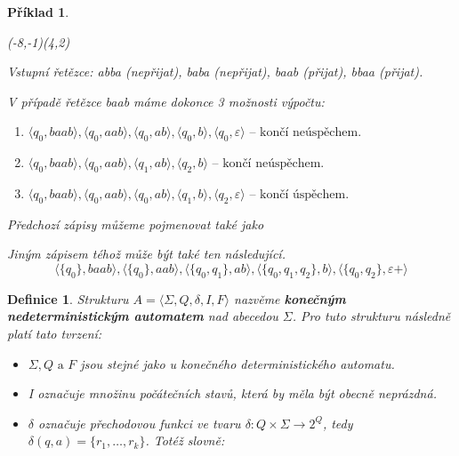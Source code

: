 \documentclass[10pt, a4paper, titlepage]{article}
\theoremstyle{note}
\newtheorem{definice}{\textbf{Definice}}
\newtheorem{priklad}{\textbf{Příklad}}
\begin{document}
\begin{priklad}
\vspace{20px}
\begin{VCPicture}{(-8,-1)(4,2)}

\end{VCPicture}


Vstupní řetězce: \textit{abba} (nepřijat), \textit{baba} (nepřijat), \textit{baab} (přijat), \textit{bbaa} (přijat).

V případě řetězce \textit{baab} máme dokonce 3 možnosti výpočtu:
\begin{enumerate}
\item
$\langle q_{0}, baab \rangle, \langle q_{0}, aab \rangle, \langle q_{0}, ab \rangle, \langle q_{0}, b \rangle, \langle q_{0}, \varepsilon \rangle \text{ -- končí neúspěchem.}$
\item
$\langle q_{0}, baab \rangle, \langle q_{0}, aab \rangle, \langle q_{1}, ab \rangle, \langle q_{2}, b \rangle \text{ -- končí neúspěchem.}$
\item
$\langle q_{0}, baab \rangle, \langle q_{0}, aab \rangle, \langle q_{0}, ab \rangle, \langle q_{1}, b \rangle, \langle q_{2}, \varepsilon \rangle \text{ -- končí úspěchem.}$ 
\end{enumerate}
Předchozí zápisy můžeme pojmenovat také jako 

Jiným zápisem téhož může být také ten následující.
$$
\langle \lbrace q_{0} \rbrace, baab \rangle, \langle \lbrace q_{0} \rbrace, aab \rangle, \langle \lbrace q_{0}, q_{1} \rbrace, ab \rangle,
\langle \lbrace q_{0}, q_{1}, q_{2} \rbrace, b \rangle, \langle \lbrace q_{0}, q_{2} \rbrace, \varepsilon+ \rangle
$$ 
\end{priklad}

\begin{definice}
Strukturu $A = \langle \Sigma, Q, \delta, I, F \rangle$ nazvěme \textbf{konečným nedeterministickým automatem} nad abecedou $\Sigma$. Pro tuto strukturu následně platí tato tvrzení:
\begin{itemize}
\item
$\Sigma, Q \text{ a } F$ jsou stejné jako u konečného deterministického automatu.
\item
\textit{I} označuje množinu počátečních stavů, která by měla být obecně neprázdná.
\item
$\delta$ označuje přechodovou funkci ve tvaru $\delta : Q \times \Sigma \rightarrow 2^{Q}$, tedy $\delta (q, a) = \lbrace r_{1}, \ldots, r_{k} \rbrace$. Totéž slovně: 
\end{itemize}
\end{definice}
\end{document}
